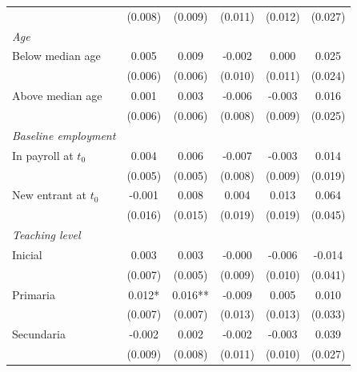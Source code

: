 \begin{tabular}{lccccc}
 & (0.008) & (0.009) & (0.011) & (0.012) & (0.027) \\
\addlinespace
\emph{Age} \\
\quad Below median age & 0.005 & 0.009 & -0.002 & 0.000 & 0.025 \\
 & (0.006) & (0.006) & (0.010) & (0.011) & (0.024) \\
\quad Above median age & 0.001 & 0.003 & -0.006 & -0.003 & 0.016 \\
 & (0.006) & (0.006) & (0.008) & (0.009) & (0.025) \\
\addlinespace
\emph{Baseline employment} \\
\quad In payroll at $t_0$ & 0.004 & 0.006 & -0.007 & -0.003 & 0.014 \\
 & (0.005) & (0.005) & (0.008) & (0.009) & (0.019) \\
\quad New entrant at $t_0$ & -0.001 & 0.008 & 0.004 & 0.013 & 0.064 \\
 & (0.016) & (0.015) & (0.019) & (0.019) & (0.045) \\
\addlinespace
\emph{Teaching level} \\
\quad Inicial & 0.003 & 0.003 & -0.000 & -0.006 & -0.014 \\
 & (0.007) & (0.005) & (0.009) & (0.010) & (0.041) \\
\quad Primaria & 0.012* & 0.016** & -0.009 & 0.005 & 0.010 \\
 & (0.007) & (0.007) & (0.013) & (0.013) & (0.033) \\
\quad Secundaria & -0.002 & 0.002 & -0.002 & -0.003 & 0.039 \\
 & (0.009) & (0.008) & (0.011) & (0.010) & (0.027) \\
\bottomrule
\end{tabular}
